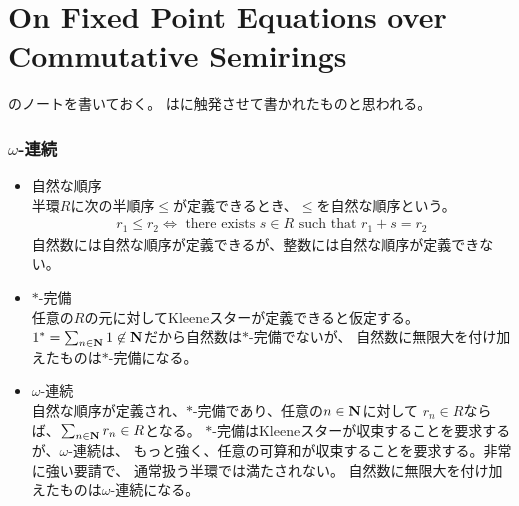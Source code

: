 \begingroup %
\newcommand{\bou}{{\,|\,}}
\newcommand{\boug}{{\,\big|\,}}
\newcommand{\bougg}{{\,\bigg|\,}}
\newcommand{\qD}{{\op{D}}}
\newcommand{\qI}{{\op{I}}}
{\setlength\arraycolsep{2pt}
%
\section{On Fixed Point Equations over Commutative Semirings}\label{s1:EKL07} %
	\cite{EKL07}のノートを書いておく。
	\cite{EKL07}は\cite{Hopkins99}に触発させて書かれたものと思われる。

\subsubsection{$\omega$-連続}\label{s3:オメガ-連続} %
	\begin{itemize}\setlength{\itemsep}{-1mm} %
		\item 自然な順序 \\
		半環$R$に次の半順序$\le$が定義できるとき、$\le$を自然な順序という。
		\begin{equation*}\begin{split}
			r_1\le r_2 \iff \text{ there exists } s\in R \text{ such that } 
			r_1 + s = r_2
		\end{split}\end{equation*}
		自然数には自然な順序が定義できるが、整数には自然な順序が定義できない。
		\item $*$-完備 \\
		任意の$R$の元に対してKleeneスターが定義できると仮定する。
		$1^*=\sum_{n\in\mathbf{N}}1\not\in\mathbf{N}$だから自然数は$*$-完備でないが、
		自然数に無限大を付け加えたものは$*$-完備になる。
		\item $\omega$-連続 \\
		自然な順序が定義され、$*$-完備であり、任意の$n\in\mathbf{N}$に対して
		$r_n\in R$ならば、$\sum_{n\in\mathbf{N}}r_n\in R$となる。
		$*$-完備はKleeneスターが収束することを要求するが、$\omega$-連続は、
		もっと強く、任意の可算和が収束することを要求する。非常に強い要請で、
		通常扱う半環では満たされない。
		自然数に無限大を付け加えたものは$\omega$-連続になる。
	\end{itemize} %

}
